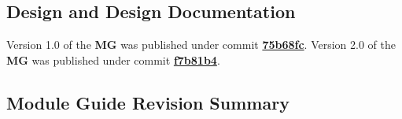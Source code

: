 \documentclass{article}
\begin{document}
\subsection{Design and Design Documentation}
\noindent Version 1.0 of the \textbf{MG} was published under commit \href{https://github.com/KiranSingh15/CAS-741-Image-Correspondences/commit/75b68fcefe01cadebe7cf7eaae0b135417635167}{\textbf{75b68fc}}. Version 2.0 of the \textbf{MG} was published under commit \href{https://github.com/KiranSingh15/CAS-741-Image-Correspondences/commit/f7b81b48841c440ab665efb53fc0c8291c9c0e53}{\textbf{f7b81b4}}.

\subsection*{Module Guide Revision Summary}
\end{document}
